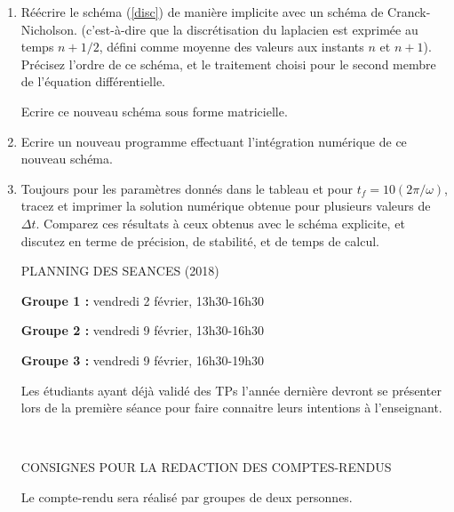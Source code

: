\documentclass[a4,12pt]{article}
\begin{document}
\begin{enumerate}
\item R\'e\'ecrire le sch\'ema (\ref{disc}) de mani\`ere implicite avec un schéma de Cranck-Nicholson.
(c'est-\`a-dire que la discr\'etisation du laplacien est exprim\'ee au temps $n+1/2$, défini comme 
moyenne des valeurs aux instants $n$ et $n+1$). Précisez l'ordre de ce schéma, et le traitement 
choisi pour le second membre de l'équation différentielle.


Ecrire ce nouveau schéma sous forme matricielle. 

\item Ecrire un nouveau programme effectuant l'intégration numérique de ce nouveau schéma.

\item Toujours pour les paramètres donnés dans le tableau et pour $t_f = 10 (2\pi/\omega)$, tracez et imprimer la solution numérique obtenue pour plusieurs valeurs de $\Delta t$. Comparez ces résultats à ceux obtenus avec le schéma explicite, et discutez en terme de précision, de stabilité, 
et de temps de calcul.


\clearpage





\selectfont
{}\selectfont




\noindent 

\begin{center}
{\Large PLANNING DES SEANCES (2018)}
\end{center}
\noindent


{\bf Groupe 1 :} vendredi 2 février, 13h30-16h30

{\bf Groupe 2 :} vendredi 9 février, 13h30-16h30

{\bf Groupe 3 :} vendredi 9 février, 16h30-19h30 

\noindent
Les étudiants ayant déjà validé des TPs l'année dernière devront se présenter lors de la première séance pour faire connaitre leurs intentions à l'enseignant.

~\\
\begin{center}
{\Large CONSIGNES POUR LA REDACTION DES COMPTES-RENDUS}
\end{center}
\noindent
Le compte-rendu sera réalisé par groupes de deux personnes.


\end{enumerate}
\end{document}
